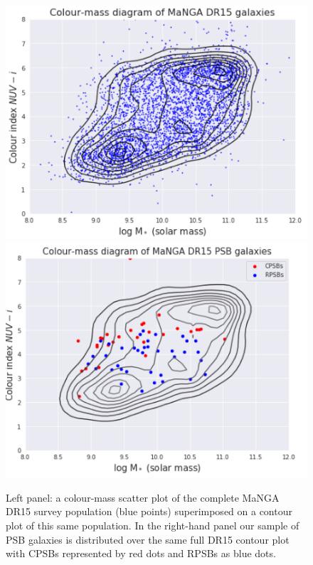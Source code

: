 \begin{figure}[h]
    \centering
    \includegraphics[width=\columnwidth]{images/CMDs/Colour-Mass-DR15-All.png}
    \includegraphics[width=\columnwidth]{images/CMDs/Colour-Mass-DR15-PSBs.png}
    \caption{Left panel: a colour-mass scatter plot of the complete MaNGA DR15 survey population (blue points) superimposed on a contour plot of this same population. In the right-hand panel our sample of PSB galaxies is distributed over the same full DR15 contour plot with CPSBs represented by red dots and RPSBs as blue dots.}
    \label{fig:Colour-Mass-PSBs}
\end{figure}



